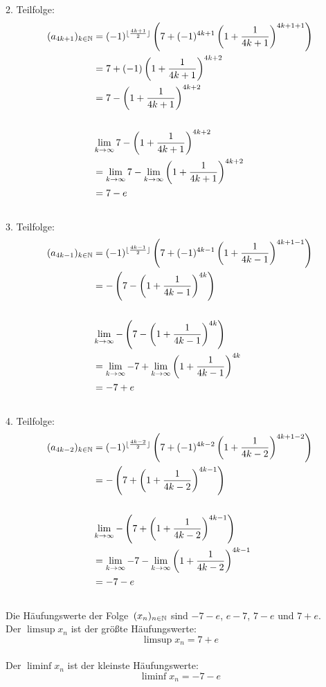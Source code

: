 \begin{lsg}
2. Teilfolge:\\
\[
\begin{aligned}
(a_{4k+1})_{k\in\mathbb{N}}
&=(-1)^{\lfloor \frac{4k+1}{2}\rfloor} \left( 7 + 
(-1)^{4k+1}\left(1+\frac{1}{4k+1}\right)^{4k+1+1} \right)\\
&=7+(-1)\left(1+\frac{1}{4k+1}\right)^{4k+2}\\
&=7-\left(1+\frac{1}{4k+1}\right)^{4k+2}\\
\\
&\lim \limits_{k \to \infty} 7-\left(1+\frac{1}{4k+1}\right)^{4k+2}\\
&=\lim \limits_{k \to \infty} 7 - \lim \limits_{k \to 
\infty}\left(1+\frac{1}{4k+1}\right)^{4k+2}\\
&=7-e
\end{aligned}
\]
\\
3. Teilfolge:\\
\[
\begin{aligned}
(a_{4k-1})_{k\in\mathbb{N}}
&=(-1)^{\lfloor \frac{4k-1}{2}\rfloor} \left( 7 + 
(-1)^{4k-1}\left(1+\frac{1}{4k-1}\right)^{4k+1-1} \right)\\
&=-\left(7-\left(1+\frac{1}{4k-1}\right)^{4k}\right)\\
\\
&\lim \limits_{k \to \infty} 
-\left(7-\left(1+\frac{1}{4k-1}\right)^{4k}\right)\\
&=\lim \limits_{k \to \infty} -7+ \lim \limits_{k \to 
\infty}\left(1+\frac{1}{4k-1}\right)^{4k}\\
&=-7+e
\end{aligned}
\]\\
4. Teilfolge:\\
\[
\begin{aligned}
(a_{4k-2})_{k\in\mathbb{N}}
&=(-1)^{\lfloor \frac{4k-2}{2}\rfloor} \left( 7 + 
(-1)^{4k-2}\left(1+\frac{1}{4k-2}\right)^{4k+1-2} \right)\\
&=-\left(7+\left(1+\frac{1}{4k-2}\right)^{4k-1}\right)\\
\\
&\lim \limits_{k \to \infty} 
-\left(7+\left(1+\frac{1}{4k-2}\right)^{4k-1}\right)\\
&=\lim \limits_{k \to \infty} -7- \lim \limits_{k \to 
\infty}\left(1+\frac{1}{4k-2}\right)^{4k-1}\\
&=-7-e
\end{aligned}
\]\\

Die H\"aufungswerte der Folge~$(x_n)_{n\in\mathbb{N}}$ sind $-7-e$, $e-7$, $7-e$ und 
$7+e$.\\

Der $\limsup x_n$ ist der gr\"oßte H\"aufungswerte: 
\[
\limsup x_n= 7+e
\]\\
Der $\liminf x_n$ ist der kleinste H\"aufungswerte: 
\[
\liminf x_n=-7-e
\]\\
\end{lsg}


